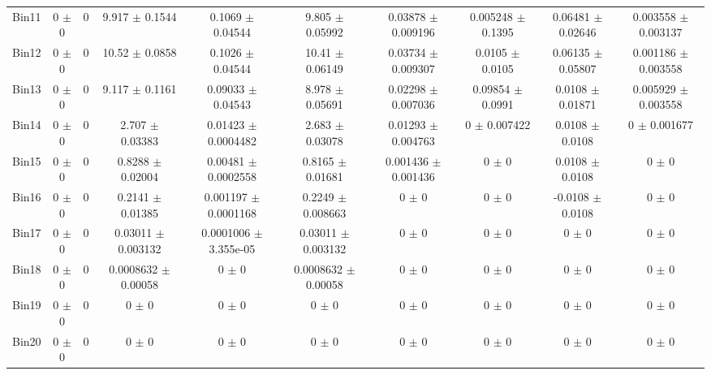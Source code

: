 \begin{tabular}{@{\extracolsep{4pt}}lccccccccc@{}}
     Bin11 & 0 $\pm$ 0 & 0 & 9.917 $\pm$ 0.1544 & 0.1069 $\pm$ 0.04544 & 9.805 $\pm$ 0.05992 & 0.03878 $\pm$ 0.009196 & 0.005248 $\pm$ 0.1395 & 0.06481 $\pm$ 0.02646 & 0.003558 $\pm$ 0.003137 \\ 
     Bin12 & 0 $\pm$ 0 & 0 & 10.52 $\pm$ 0.0858 & 0.1026 $\pm$ 0.04544 & 10.41 $\pm$ 0.06149 & 0.03734 $\pm$ 0.009307 & 0.0105 $\pm$ 0.0105 & 0.06135 $\pm$ 0.05807 & 0.001186 $\pm$ 0.003558 \\ 
     Bin13 & 0 $\pm$ 0 & 0 & 9.117 $\pm$ 0.1161 & 0.09033 $\pm$ 0.04543 & 8.978 $\pm$ 0.05691 & 0.02298 $\pm$ 0.007036 & 0.09854 $\pm$ 0.0991 & 0.0108 $\pm$ 0.01871 & 0.005929 $\pm$ 0.003558 \\ 
     Bin14 & 0 $\pm$ 0 & 0 & 2.707 $\pm$ 0.03383 & 0.01423 $\pm$ 0.0004482 & 2.683 $\pm$ 0.03078 & 0.01293 $\pm$ 0.004763 & 0 $\pm$ 0.007422 & 0.0108 $\pm$ 0.0108 & 0 $\pm$ 0.001677 \\ 
     Bin15 & 0 $\pm$ 0 & 0 & 0.8288 $\pm$ 0.02004 & 0.00481 $\pm$ 0.0002558 & 0.8165 $\pm$ 0.01681 & 0.001436 $\pm$ 0.001436 & 0 $\pm$ 0 & 0.0108 $\pm$ 0.0108 & 0 $\pm$ 0 \\ 
     Bin16 & 0 $\pm$ 0 & 0 & 0.2141 $\pm$ 0.01385 & 0.001197 $\pm$ 0.0001168 & 0.2249 $\pm$ 0.008663 & 0 $\pm$ 0 & 0 $\pm$ 0 & -0.0108 $\pm$ 0.0108 & 0 $\pm$ 0 \\ 
     Bin17 & 0 $\pm$ 0 & 0 & 0.03011 $\pm$ 0.003132 & 0.0001006 $\pm$ 3.355e-05 & 0.03011 $\pm$ 0.003132 & 0 $\pm$ 0 & 0 $\pm$ 0 & 0 $\pm$ 0 & 0 $\pm$ 0 \\ 
     Bin18 & 0 $\pm$ 0 & 0 & 0.0008632 $\pm$ 0.00058 & 0 $\pm$ 0 & 0.0008632 $\pm$ 0.00058 & 0 $\pm$ 0 & 0 $\pm$ 0 & 0 $\pm$ 0 & 0 $\pm$ 0 \\ 
     Bin19 & 0 $\pm$ 0 & 0 & 0 $\pm$ 0 & 0 $\pm$ 0 & 0 $\pm$ 0 & 0 $\pm$ 0 & 0 $\pm$ 0 & 0 $\pm$ 0 & 0 $\pm$ 0 \\ 
     Bin20 & 0 $\pm$ 0 & 0 & 0 $\pm$ 0 & 0 $\pm$ 0 & 0 $\pm$ 0 & 0 $\pm$ 0 & 0 $\pm$ 0 & 0 $\pm$ 0 & 0 $\pm$ 0 \\ 
\hline\hline
  \end{tabular}
